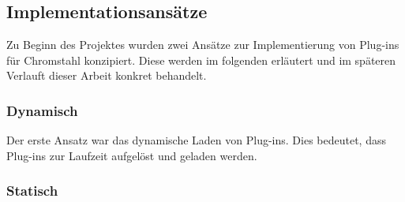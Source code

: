 \subsection{Implementationsansätze}
Zu Beginn des Projektes wurden zwei Ansätze zur Implementierung von Plug-ins für
Chromstahl konzipiert. Diese werden im folgenden erläutert und im späteren
Verlauft dieser Arbeit konkret behandelt.
\subsubsection{Dynamisch}
Der erste Ansatz war das dynamische Laden von Plug-ins. Dies bedeutet, dass
Plug-ins zur Laufzeit aufgelöst und geladen werden. 
\subsubsection{Statisch}
